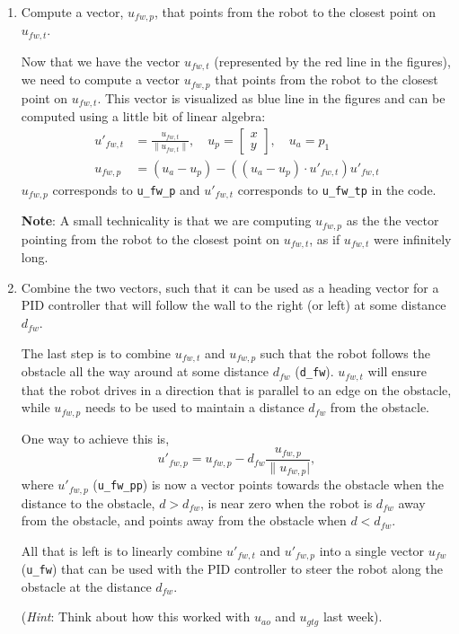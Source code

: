 \documentclass[10pt]{article}
\begin{document}
\begin{enumerate}
	\item Compute a vector, $u_{fw,p}$, that points from the robot to the closest point on $u_{fw,t}$.
	
	Now that we have the vector $u_{fw,t}$ (represented by the red line in the figures), we need to compute a vector $u_{fw,p}$ that points from the robot to the closest point on $u_{fw,t}$. This vector is visualized as blue line in the figures and can be computed using a little bit of linear algebra:
	\begin{equation*}
		\begin{split}
			u'_{fw,t} &= \frac{u_{fw,t}}{\|u_{fw,t}\|}, \quad u_p = \begin{bmatrix} x \\ y \end{bmatrix}, \quad u_a = p_1 \\
			u_{fw,p} &= (u_a-u_p)-((u_a-u_p)\cdot u'_{fw,t})u'_{fw,t}
		\end{split}
	\end{equation*}
	$u_{fw,p}$ corresponds to \texttt{u\_fw\_p} and $u'_{fw,t}$ corresponds to \texttt{u\_fw\_tp} in the code. 
	
	\textbf{Note}: A small technicality is that we are computing $u_{fw,p}$ as the the vector pointing from the robot to the closest point on $u_{fw,t}$, as if $u_{fw,t}$ were infinitely long.
	
	\item Combine the two vectors, such that it can be used as a heading vector for a PID controller that will follow the wall to the right (or left) at some distance $d_{fw}$.
	
	The last step is to combine $u_{fw,t}$ and $u_{fw,p}$ such that the robot follows the obstacle all the way around at some distance $d_{fw}$ (\texttt{d\_fw}). $u_{fw,t}$ will ensure that the robot drives in a direction that is parallel to an edge on the obstacle, while $u_{fw,p}$ needs to be used to maintain a distance $d_{fw}$ from the obstacle.
	
	One way to achieve this is,
	\begin{equation*}
		u'_{fw,p} = u_{fw,p}-d_{fw}\frac{u_{fw,p}}{\|u_{fw,p}|},
	\end{equation*} 
	where $u'_{fw,p}$ (\texttt{u\_fw\_pp}) is now a vector points towards the obstacle when the distance to the obstacle, $d>d_{fw}$, is near zero when the robot is $d_{fw}$ away from the obstacle, and points away from the obstacle when $d<d_{fw}$.
	
	All that is left is to linearly combine $u'_{fw,t}$ and $u'_{fw,p}$ into a single vector $u_{fw}$ (\texttt{u\_fw}) that can be used with the PID controller to steer the robot along the obstacle at the distance $d_{fw}$.
	
	(\textit{Hint}: Think about how this worked with $u_{ao}$ and $u_{gtg}$ last week).	
\end{enumerate}
\end{document}
